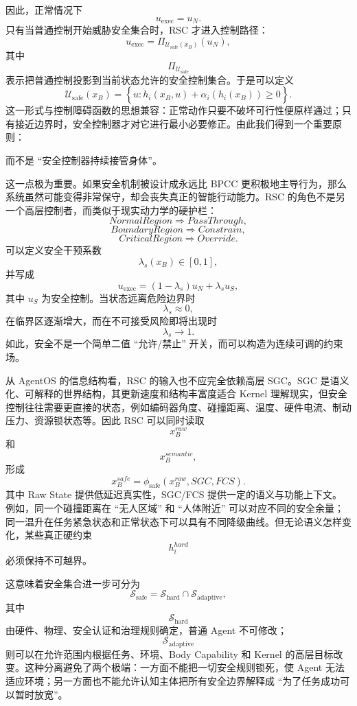 因此，正常情况下
\[
u_{\mathrm{exec}}
=
u_N.
\]
只有当普通控制开始威胁安全集合时，RSC 才进入控制路径：
\[
u_{\mathrm{exec}}
=
\Pi_{\mathcal U_{\mathrm{safe}}(x_B)}
\left(
u_N
\right),
\]
其中
\[
\Pi_{\mathcal U_{\mathrm{safe}}}
\]
表示把普通控制投影到当前状态允许的安全控制集合。于是可以定义
\[
\mathcal U_{\mathrm{safe}}(x_B)
=
\left\{
u:
\dot h_i(x_B,u)
+
\alpha_i(h_i(x_B))
\geq0
\right\}.
\]
这一形式与控制障碍函数的思想兼容：正常动作只要不破坏可行性便原样通过；只有接近边界时，安全控制器才对它进行最小必要修正。由此我们得到一个重要原则：
\begin{statementbox}
\centering
{}
\end{statementbox}
而不是 ``安全控制器持续接管身体''。

这一点极为重要。如果安全机制被设计成永远比 BPCC 更积极地主导行为，那么系统虽然可能变得非常保守，却会丧失真正的智能行动能力。RSC 的角色不是另一个高层控制者，而类似于现实动力学的硬护栏：
\[
NormalRegion
\Rightarrow
PassThrough,
\]
\[
BoundaryRegion
\Rightarrow
Constrain,
\]
\[
CriticalRegion
\Rightarrow
Override.
\]
可以定义安全干预系数
\[
\lambda_s(x_B)\in[0,1],
\]
并写成
\[
u_{\mathrm{exec}}
=
(1-\lambda_s)u_N
+
\lambda_su_S,
\]
其中 $u_S$ 为安全控制。当状态远离危险边界时
\[
\lambda_s\approx0,
\]
在临界区逐渐增大，而在不可接受风险即将出现时
\[
\lambda_s\rightarrow1.
\]
如此，安全不是一个简单二值 ``允许/禁止'' 开关，而可以构造为连续可调的约束场。

从 AgentOS 的信息结构看，RSC 的输入也不应完全依赖高层 SGC。SGC 是语义化、可解释的世界结构，其更新速度和结构丰富度适合 Kernel 理解现实，但安全控制往往需要更直接的状态，例如编码器角度、碰撞距离、温度、硬件电流、制动压力、资源锁状态等。因此 RSC 可以同时读取
\[
x_B^{raw}
\]
和
\[
x_B^{semantic},
\]
形成
\[
x_B^{safe}
=
\phi_{\mathrm{safe}}
(
x_B^{raw},
SGC,
FCS
).
\]
其中 Raw State 提供低延迟真实性，SGC/FCS 提供一定的语义与功能上下文。例如，同一个碰撞距离在 ``无人区域'' 和 ``人体附近'' 可以对应不同的安全余量；同一温升在任务紧急状态和正常状态下可以具有不同降级曲线。但无论语义怎样变化，某些真正硬约束
\[
h_i^{hard}
\]
必须保持不可越界。

这意味着安全集合进一步可分为
\[
\mathcal S_{\mathrm{safe}}
=
\mathcal S_{\mathrm{hard}}
\cap
\mathcal S_{\mathrm{adaptive}},
\]
其中
\[
\mathcal S_{\mathrm{hard}}
\]
由硬件、物理、安全认证和治理规则确定，普通 Agent 不可修改；
\[
\mathcal S_{\mathrm{adaptive}}
\]
则可以在允许范围内根据任务、环境、Body Capability 和 Kernel 的高层目标改变。这种分离避免了两个极端：一方面不能把一切安全规则锁死，使 Agent 无法适应环境；另一方面也不能允许认知主体把所有安全边界解释成 ``为了任务成功可以暂时放宽''。

